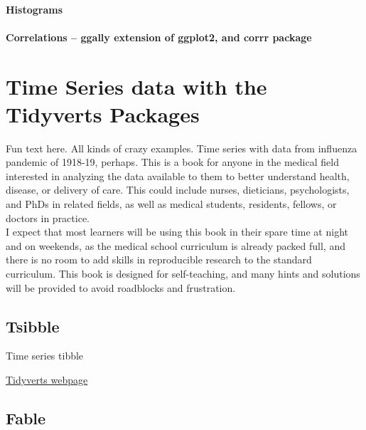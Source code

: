 \documentclass[
]{book}
\begin{document}
\hypertarget{histograms}{%
\subsubsection{Histograms}\label{histograms}}

\hypertarget{correlations-ggally-extension-of-ggplot2-and-corrr-package}{%
\subsubsection{Correlations -- ggally extension of ggplot2, and corrr package}\label{correlations-ggally-extension-of-ggplot2-and-corrr-package}}

\hypertarget{time-series-data-with-the-tidyverts-packages}{%
\chapter{Time Series data with the Tidyverts Packages}\label{time-series-data-with-the-tidyverts-packages}}

Fun text here.
All kinds of crazy examples.
Time series with data from influenza pandemic of 1918-19, perhaps.
This is a book for anyone in the medical field interested in analyzing the data available to them to better understand health, disease, or delivery of care. This could include nurses, dieticians, psychologists, and PhDs in related fields, as well as medical students, residents, fellows, or doctors in practice.\\
I expect that most learners will be using this book in their spare time at night and on weekends, as the medical school curriculum is already packed full, and there is no room to add skills in reproducible research to the standard curriculum. This book is designed for self-teaching, and many hints and solutions will be provided to avoid roadblocks and frustration.

\hypertarget{tsibble}{%
\section{Tsibble}\label{tsibble}}

Time series tibble

\href{https://tidyverts.org}{Tidyverts webpage}

\hypertarget{fable}{%
\section{Fable}\label{fable}}
\end{document}
